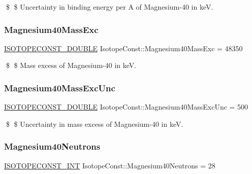 \$ \$ Uncertainty in binding energy per A of Magnesium-\/40 in keV. \mbox{\label{group___isotope_const-_magnesium-_mg40_ga5697cf6797932935c997560459ec53f6}} 
\subsubsection{\texorpdfstring{Magnesium40\+Mass\+Exc}{Magnesium40MassExc}}
{\footnotesize\ttfamily \mbox{\hyperlink{group___isotope_const-_macros_ga8f45a7272ce02c0b4c65c44636ed719a}{I\+S\+O\+T\+O\+P\+E\+C\+O\+N\+S\+T\+\_\+\+D\+O\+U\+B\+LE}} Isotope\+Const\+::\+Magnesium40\+Mass\+Exc = 48350}

\$ \$ Mass excess of Magnesium-\/40 in keV. \mbox{\label{group___isotope_const-_magnesium-_mg40_ga11b7d3c3dce48afd0292c109b0918176}} 
\subsubsection{\texorpdfstring{Magnesium40\+Mass\+Exc\+Unc}{Magnesium40MassExcUnc}}
{\footnotesize\ttfamily \mbox{\hyperlink{group___isotope_const-_macros_ga8f45a7272ce02c0b4c65c44636ed719a}{I\+S\+O\+T\+O\+P\+E\+C\+O\+N\+S\+T\+\_\+\+D\+O\+U\+B\+LE}} Isotope\+Const\+::\+Magnesium40\+Mass\+Exc\+Unc = 500}

\$ \$ Uncertainty in mass excess of Magnesium-\/40 in keV. \mbox{\label{group___isotope_const-_magnesium-_mg40_gadba7b734bf314bb972fe24351e12aa58}} 
\subsubsection{\texorpdfstring{Magnesium40\+Neutrons}{Magnesium40Neutrons}}
{\footnotesize\ttfamily \mbox{\hyperlink{group___isotope_const-_macros_ga5f18360b3e99483a35c32d789e62621c}{I\+S\+O\+T\+O\+P\+E\+C\+O\+N\+S\+T\+\_\+\+I\+NT}} Isotope\+Const\+::\+Magnesium40\+Neutrons = 28}

